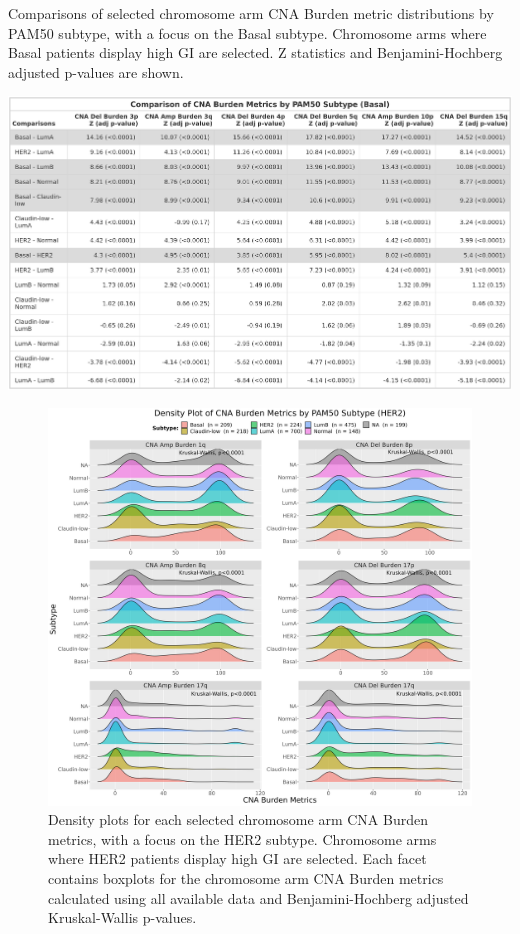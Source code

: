 \begin{table}[!htb]
\center
\caption[Comparisons of selected chromosome arm CNA Burden metric distributions by PAM50 subtype, with a focus on the Basal subtype.]{Comparisons of selected chromosome arm CNA Burden metric distributions by PAM50 subtype, with a focus on the Basal subtype. Chromosome arms where Basal patients display high GI are selected. Z statistics and Benjamini-Hochberg adjusted p-values are shown.}
\includegraphics[width=1\textwidth]{../tables/Chapter_2/ChrArm_CNA_Burden_Metric_Comparisons_Basal.png}
\label{tab:PA-CNA-Score-Metric-Density-P50-5q}
\end{table}

\begin{figure}[!ht]
\center
\includegraphics[width=1\textwidth]{../figures/Chapter_2/ChrArm_CNA_Burden_Metrics_Across_PAM50_HER2_Burden.png}
\caption[Density plots for each selected chromosome arm CNA Burden metrics, with a focus on the HER2 subtype.]{Density plots for each selected chromosome arm CNA Burden metrics, with a focus on the HER2 subtype. Chromosome arms where HER2 patients display high GI are selected. Each facet contains boxplots for the chromosome arm CNA Burden metrics calculated using all available data and Benjamini-Hochberg adjusted Kruskal-Wallis p-values.}

\label{fig:PA-CNA-Score-Metric-Density-P50-17q}
\end{figure}

